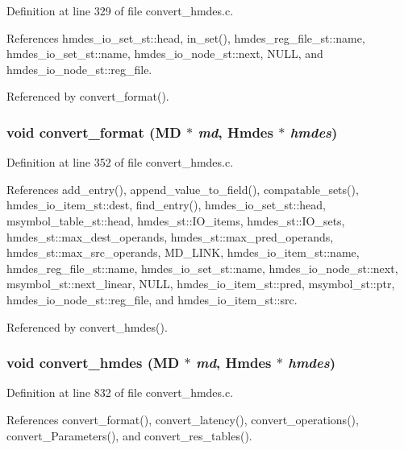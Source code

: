 Definition at line 329 of file convert\_\-hmdes.c.

References hmdes\_\-io\_\-set\_\-st::head, in\_\-set(), hmdes\_\-reg\_\-file\_\-st::name, hmdes\_\-io\_\-set\_\-st::name, hmdes\_\-io\_\-node\_\-st::next, NULL, and hmdes\_\-io\_\-node\_\-st::reg\_\-file.

Referenced by convert\_\-format().
\subsubsection{\setlength{\rightskip}{0pt plus 5cm}void convert\_\-format (\bf{MD} $\ast$ {\em md}, \bf{Hmdes} $\ast$ {\em hmdes})}\label{convert__hmdes_8c_e050552b2cb01a9ba04eda87064a6e4e}




Definition at line 352 of file convert\_\-hmdes.c.

References add\_\-entry(), append\_\-value\_\-to\_\-field(), compatable\_\-sets(), hmdes\_\-io\_\-item\_\-st::dest, find\_\-entry(), hmdes\_\-io\_\-set\_\-st::head, msymbol\_\-table\_\-st::head, hmdes\_\-st::IO\_\-items, hmdes\_\-st::IO\_\-sets, hmdes\_\-st::max\_\-dest\_\-operands, hmdes\_\-st::max\_\-pred\_\-operands, hmdes\_\-st::max\_\-src\_\-operands, MD\_\-LINK, hmdes\_\-io\_\-item\_\-st::name, hmdes\_\-reg\_\-file\_\-st::name, hmdes\_\-io\_\-set\_\-st::name, hmdes\_\-io\_\-node\_\-st::next, msymbol\_\-st::next\_\-linear, NULL, hmdes\_\-io\_\-item\_\-st::pred, msymbol\_\-st::ptr, hmdes\_\-io\_\-node\_\-st::reg\_\-file, and hmdes\_\-io\_\-item\_\-st::src.

Referenced by convert\_\-hmdes().
\subsubsection{\setlength{\rightskip}{0pt plus 5cm}void convert\_\-hmdes (\bf{MD} $\ast$ {\em md}, \bf{Hmdes} $\ast$ {\em hmdes})}\label{convert__hmdes_8c_1c8abf12365ede1d73d0fb9183fb6cdd}




Definition at line 832 of file convert\_\-hmdes.c.

References convert\_\-format(), convert\_\-latency(), convert\_\-operations(), convert\_\-Parameters(), and convert\_\-res\_\-tables().

